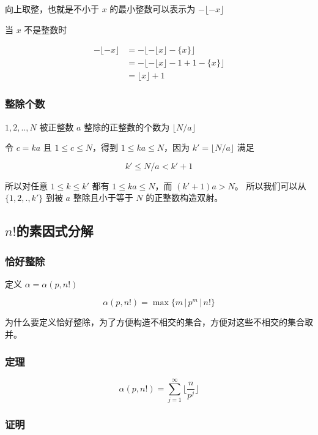 \documentclass[12pt,a4paper]{ctexart}
\begin{document}
向上取整，也就是不小于 $x$ 的最小整数可以表示为 $-\lfloor - x \rfloor$

当 $x$ 不是整数时

\begin{align*}
    -\lfloor -x \rfloor &= - \lfloor -\lfloor x \rfloor - \{ x \} \rfloor \\
    &= - \lfloor -\lfloor x \rfloor - 1 + 1 - \{ x \} \rfloor  \\
    &= \lfloor x \rfloor + 1
\end{align*}

\subsubsection{整除个数}

$1,2,..,N$ 被正整数 $a$ 整除的正整数的个数为 $\lfloor N/a \rfloor$

令 $c = ka$ 且 $1 \le c \le N$，得到 $1 \le ka \le N$，因为 $k' = \lfloor N / a \rfloor$ 满足

\[
k' \le N/a < k' + 1
\]

所以对任意 $1 \le k \le k'$ 都有 $1 \le ka \le N$，而 $(k'+1)a > N$。
所以我们可以从 $\{ 1,2,.,k' \}$ 到被 $a$ 整除且小于等于 $N$ 的正整数构造双射。

\subsection{$n!$的素因式分解}

\subsubsection{恰好整除}

定义 $\alpha = \alpha(p,n!)$ 

\[
\alpha(p,n!) = \max \{ m \,\vert\, p^m \,\vert\, n! \}
\]

为什么要定义恰好整除，为了方便构造不相交的集合，方便对这些不相交的集合取并。

\subsubsection{定理}

\[
\alpha(p,n!) = \sum_{j=1}^{\infty}\lfloor \frac{n}{p^j}\rfloor
\]

\subsubsection{证明}
\end{document}
